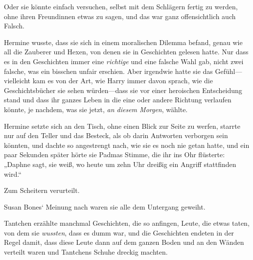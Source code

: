 Oder sie könnte einfach versuchen, selbst mit dem Schlägern fertig zu werden, ohne ihren Freundinnen etwas zu sagen, und das war ganz offensichtlich auch Falsch.

Hermine wusste, dass sie sich in einem moralischen Dilemma befand, genau wie all die Zauberer und Hexen, von denen sie in Geschichten gelesen hatte. Nur dass es in den Geschichten immer eine \emph{richtige} und eine falsche Wahl gab, nicht zwei falsche, was ein bisschen unfair erschien. Aber irgendwie hatte sie das Gefühl—vielleicht kam es von der Art, wie Harry immer davon sprach, wie die Geschichtsbücher sie sehen würden—dass sie vor einer heroischen Entscheidung stand und dass ihr ganzes Leben in die eine oder andere Richtung verlaufen könnte, je nachdem, was sie jetzt, \emph{an diesem Morgen}, wählte.

Hermine setzte sich an den Tisch, ohne einen Blick zur Seite zu werfen, starrte nur auf den Teller und das Besteck, als ob darin Antworten verborgen sein könnten, und dachte so angestrengt nach, wie sie es noch nie getan hatte, und ein paar Sekunden später hörte sie Padmas Stimme, die ihr ins Ohr flüsterte: „Daphne sagt, sie weiß, wo heute um zehn Uhr dreißig ein Angriff stattfinden wird.“

\later

Zum Scheitern verurteilt.

Susan Bones‘ Meinung nach waren sie alle dem Untergang geweiht.

Tantchen erzählte manchmal Geschichten, die so anfingen, Leute, die etwas taten, von dem sie \emph{wussten}, dass es dumm war, und die Geschichten endeten in der Regel damit, dass diese Leute dann auf dem ganzen Boden und an den Wänden verteilt waren und Tantchens Schuhe dreckig machten.

